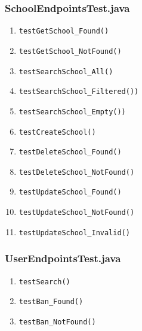 \subsubsection{SchoolEndpointsTest.java}
\begin{enumerate}
	\renewcommand{\theenumi}{\arabic{enumi}}
	\renewcommand{\labelenumi}{\theenumi}
	\item \texttt{testGetSchool\_Found()} \label{test:testGetSchool_Found:School}
	\item \texttt{testGetSchool\_NotFound()} \label{test:testGetSchool_NotFound:School}
	\item \texttt{testSearchSchool\_All()} \label{test:testSearchSchool_All:School}
	\item \texttt{testSearchSchool\_Filtered())} \label{test:testSearchSchool_Filtered:School}
	\item \texttt{testSearchSchool\_Empty())} \label{test:testSearchSchool_Empty:School}
	\item \texttt{testCreateSchool()} \label{test:testCreateSchool:School}
	\item \texttt{testDeleteSchool\_Found()} \label{test:testDeleteSchool_Found:School}
	\item \texttt{testDeleteSchool\_NotFound()} \label{test:testDeleteSchool_NotFound:School}
	\item \texttt{testUpdateSchool\_Found()} \label{test:testUpdateSchool_Found:School}
	\item \texttt{testUpdateSchool\_NotFound()} \label{test:testUpdateSchool_NotFound:School}
	\item \texttt{testUpdateSchool\_Invalid()} \label{test:testUpdateSchool_Invalid:School}
\end{enumerate}

\subsubsection{UserEndpointsTest.java}
\begin{enumerate}
	\renewcommand{\theenumi}{\arabic{enumi}}
	\renewcommand{\labelenumi}{\theenumi}
	\item \texttt{testSearch()} \label{test:testSearch:User}
	\item \texttt{testBan\_Found()} \label{test:testBan_Found:User}
	\item \texttt{testBan\_NotFound()} \label{test:testBan_NotFound:User}
\end{enumerate}

